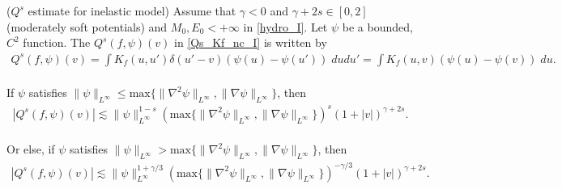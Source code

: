 \documentclass[10pt,a4paper]{amsart}
\begin{document}
\begin{lemma} ($Q^s$ estimate for inelastic model) \label{Q_est_I} Assume that $\gamma<0$ and $\gamma+2s \in [0,2]$ (moderately soft potentials) and $M_0, E_0 < +\infty$ in \eqref{hydro_I}. Let $\psi$ be a bounded, $C^2$ function. The $Q^{s}(f,\psi)(v)$ in \eqref{Qs_Kf_nc_I} is written by
\begin{align*}
    Q^{s}(f,\psi)(v) = \int K_f(u,u')\delta(u'-v)(\psi(u)-\psi(u')) \; dudu' =\int K_f(u,v)(\psi(u)-\psi(v)) \; du.
\end{align*} \\ 
If $\psi$ satisfies $\|\psi\|_{L^{\infty}} \leq \text{max} \{\|\nabla^2 \psi\|_{L^\infty}, \|\nabla\psi\|_{L^\infty} \}$, then 
\begin{align} \label{Q_est_1_I}
     |Q^{s}(f,\psi)(v)| 
    \lesssim
  \|\psi\|_{L^{\infty}}^{1-s}(\text{max}\{\|\nabla^2 \psi\|_{L^\infty}, \|\nabla \psi\|_{L^\infty} \})^{s}(1+|v|)^{\gamma+2s}.
\end{align} \\
Or else, if $\psi$ satisfies $\|\psi\|_{L^{\infty}} > \text{max} \{\|\nabla^2 \psi\|_{L^\infty}, \|\nabla\psi\|_{L^\infty} \}$, then
\begin{align} \label{Q_est_2_I}
     |Q^{s}(f,\psi)(v)| 
    \lesssim
    \|\psi\|_{L^{\infty}}^{1+\gamma/3}(\text{max}\{\|\nabla^2 \psi\|_{L^\infty}, \|\nabla \psi\|_{L^\infty} \})^{-\gamma/3}(1+|v|)^{\gamma+2s}.
\end{align}
\end{lemma}
\end{document}
